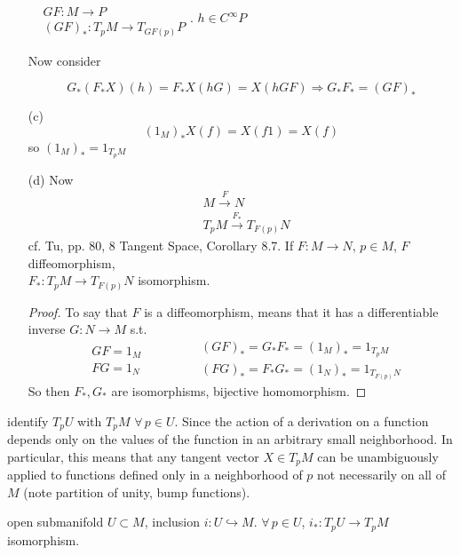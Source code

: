 \begin{enumerate}
$\begin{aligned} & \quad \\ 
  & GF : M \to P \\
  & (GF)_*: T_pM \to T_{GF(p)}P \end{aligned}$.  $h\in C^{\infty}P$

Now consider 

\[
G_* (F_*X)(h) = F_* X(hG) = X(hGF)\Longrightarrow G_* F_* = (GF)_*
\]

\item[(c)] \[
(1_M)_* X(f) = X(f1) = X(f)
\]
so $(1_M)_* = 1_{T_pM }$
\item[(d)]
Now
\[
\begin{aligned}
  & M \xrightarrow{F} N \\ 
  & T_pM \xrightarrow{ F_*} T_{F(p)}N
\end{aligned}
\]
cf. Tu, pp. 80, 8 Tangent Space, Corollary 8.7.  If $F: M \to N$, $p\in M$, $F$ diffeomorphism, \\
\phantom{cf. Tu, pp. 80, 8 Tangent Space, Corollary 8.7. } $F_*: T_p M \to T_{F(p)}N$ isomorphism.  

\begin{proof}
  To say that $F$ is a diffeomorphism, means that it has a differentiable inverse $G: N \to M$ s.t. 
\[
\begin{aligned}
  & GF = 1_M \\ 
  & FG = 1_N 
\end{aligned} \quad \quad \quad \, 
 \begin{aligned}
   & (GF)_* = G_* F_* = (1_M)_* = 1_{T_pM} \\ 
   & (FG)_* = F_* G_* = (1_N)_* = 1_{T_{F(p)}N}
\end{aligned}
\]
So then $F_*, G_*$ are isomorphisms, bijective homomorphism.  
\end{proof}
\end{enumerate}


identify $T_pU$ with $T_pM$ $\forall \, p \in U$.   Since the action of a derivation on a function depends only on the values of the function in an arbitrary small neighborhood.  
In particular, this means that any tangent vector $X \in T_pM$ can be unambiguously applied to functions defined only in a neighborhood of $p$ not necessarily on all of $M$ (note partition of unity, bump functions).  

\begin{proposition}[3.7] open submanifold $U \subset M$, inclusion $i: U \hookrightarrow M$.  $\forall \, p \in U$, $i_* : T_pU \to T_p M$ isomorphism. \end{proposition}

